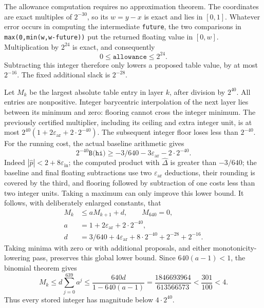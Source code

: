 The allowance computation requires no approximation theorem.  The
coordinates are exact multiples of $2^{-30}$, so its $w=y-x$ is exact
and lies in $[0,1]$.  Whatever error occurs in computing the intermediate
\texttt{future}, the two comparisons in
\texttt{max(0,min(w,w-future))} put the returned floating value in $[0,w]$.
Multiplication by $2^{24}$ is exact, and consequently
\[
 0\le\texttt{allowance}\le2^{24}.
\]
Subtracting this integer therefore only lowers a proposed table value,
by at most $2^{-16}$.  The fixed additional slack is $2^{-28}$.

Let $M_k$ be the largest absolute table entry in layer $k$, after division
by $2^{40}$.  All entries are nonpositive.  Integer barycentric
interpolation of the next layer lies between its minimum and zero:
flooring cannot cross the integer minimum.  The previously certified
multiplier, including its ceiling and extra integer unit, is at most
$2^{40}(1+2\varepsilon_{\mathrm{ar}}+2\cdot2^{-40})$.
The subsequent integer floor loses less than $2^{-40}$.
For the running cost, the actual baseline arithmetic gives
\[
 2^{-40}\texttt{B(hi)}
 \ge -3/640-3\varepsilon_{\mathrm{ar}}-2\cdot2^{-40}.
\]
Indeed $|\widehat p|<2+8\varepsilon_{\mathrm{in}}$;
the computed product with $\widehat\Delta$ is greater than $-3/640$;
the baseline and final floating subtractions use two
$\varepsilon_{\mathrm{ar}}$ deductions, their rounding is covered by
the third, and flooring followed by subtraction of one costs less than
two integer units.  Taking a maximum can only improve this lower bound.
It follows, with deliberately enlarged constants, that
\begin{align*}
 M_k&\le aM_{k+1}+d,\qquad M_{640}=0,\\
 a&=1+2\varepsilon_{\mathrm{ar}}+2\cdot2^{-40},\\
 d&=3/640+4\varepsilon_{\mathrm{ar}}+8\cdot2^{-40}
                  +2^{-28}+2^{-16}.
\end{align*}
Taking minima with zero or with additional proposals, and either
monotonicity-lowering pass, preserves this global lower bound.
Since $640(a-1)<1$, the binomial theorem gives
\[
 M_k\le d\sum_{j=0}^{639}a^j
 \le\frac{640d}{1-640(a-1)}
 =\frac{1846693964}{613566573}<\frac{301}{100}<4.
\]
Thus every stored integer has magnitude below $4\cdot2^{40}$.

